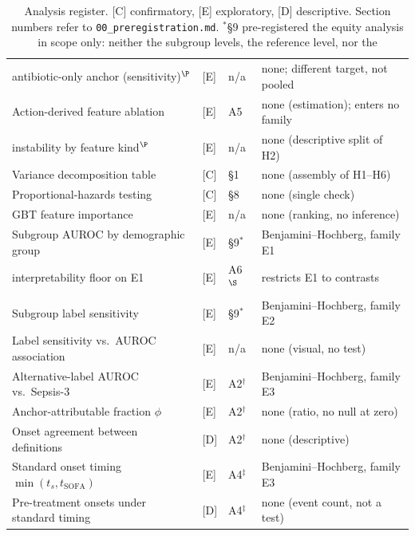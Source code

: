 \begin{table}[H]
\begin{tabular}{p{5.0cm}lp{1.9cm}p{4.2cm}}
        \quad antibiotic-only anchor (sensitivity)$^\P$ & [E] & n/a     & none; different target, not pooled \\
        Action-derived feature ablation           & [E] & A5      & none (estimation); enters no family    \\
        \quad instability by feature kind$^\P$     & [E] & n/a     & none (descriptive split of H2)         \\
        Variance decomposition table              & [C] & \S1     & none (assembly of H1--H6)              \\
        Proportional-hazards testing              & [C] & \S8     & none (single check)                    \\
        GBT feature importance                    & [E] & n/a     & none (ranking, no inference)           \\
        Subgroup AUROC by demographic group       & [E] & \S9$^*$ & Benjamini--Hochberg, family E1         \\
        \quad interpretability floor on E1         & [E] & A6$^\S$ & restricts E1 to \pcNSubgroupContrasts{} contrasts \\
        Subgroup label sensitivity                & [E] & \S9$^*$ & Benjamini--Hochberg, family E2         \\
        Label sensitivity vs.\ AUROC association  & [E] & n/a     & none (visual, no test)                 \\
        Alternative-label AUROC vs.\ Sepsis-3     & [E] & A2$^\dagger$ & Benjamini--Hochberg, family E3    \\
        Anchor-attributable fraction $\phi$       & [E] & A2$^\dagger$ & none (ratio, no null at zero)     \\
        Onset agreement between definitions       & [D] & A2$^\dagger$ & none (descriptive)                \\
        Standard onset timing $\min(t_s, t_{\text{SOFA}})$ & [E] & A4$^\ddagger$ & Benjamini--Hochberg, family E3 \\
        Pre-treatment onsets under standard timing & [D] & A4$^\ddagger$ & none (event count, not a test)   \\
        \bottomrule
    \end{tabular}
    \caption{Analysis register. [C] confirmatory, [E] exploratory,
    [D] descriptive. Section numbers refer to
    \texttt{00\_preregistration.md}. $^*$\S9 pre-registered the equity analysis
    in scope only: neither the subgroup levels, the reference level, nor the
}
\end{table}
